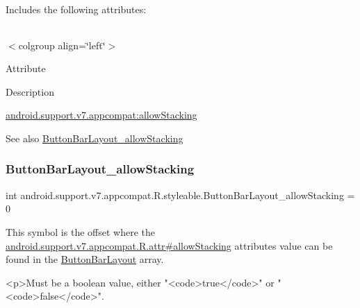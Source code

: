 Includes the following attributes\+:

\tabulinesep=1mm
\begin{longtabu} spread 0pt [c]{*{0}{|X[-1]}|}
\hline
\end{longtabu}
$<$colgroup align=\char`\"{}left\char`\"{}$>$ 

Attribute

Description 

{\ttfamily \hyperlink{classandroid_1_1support_1_1v7_1_1appcompat_1_1R_1_1styleable_a02f970ac7530c0f3ad36b53abbbeee88}{android.\+support.\+v7.\+appcompat\+:allow\+Stacking}}

\begin{DoxySeeAlso}{See also}
\hyperlink{classandroid_1_1support_1_1v7_1_1appcompat_1_1R_1_1styleable_a02f970ac7530c0f3ad36b53abbbeee88}{Button\+Bar\+Layout\+\_\+allow\+Stacking} 
\end{DoxySeeAlso}
\mbox{\label{classandroid_1_1support_1_1v7_1_1appcompat_1_1R_1_1styleable_a02f970ac7530c0f3ad36b53abbbeee88}} 
\subsubsection{\texorpdfstring{Button\+Bar\+Layout\+\_\+allow\+Stacking}{ButtonBarLayout\_allowStacking}}
{\footnotesize\ttfamily int android.\+support.\+v7.\+appcompat.\+R.\+styleable.\+Button\+Bar\+Layout\+\_\+allow\+Stacking = 0\hspace{0.3cm}{\ttfamily [static]}}

This symbol is the offset where the \hyperlink{classandroid_1_1support_1_1v7_1_1appcompat_1_1R_1_1attr_ac79789d7ec66b59b872a66a3729ba8c0}{android.\+support.\+v7.\+appcompat.\+R.\+attr\#allow\+Stacking} attribute\textquotesingle{}s value can be found in the \hyperlink{classandroid_1_1support_1_1v7_1_1appcompat_1_1R_1_1styleable_a7c65a92be88c9f9803f46314aaabe499}{Button\+Bar\+Layout} array.

\begin{DoxyVerb}      <p>Must be a boolean value, either "<code>true</code>" or "<code>false</code>".
\end{DoxyVerb}
 

